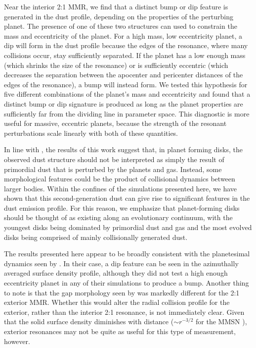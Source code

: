 \documentclass[twocolumn]{aastex63}
\begin{document}
Near the interior 2:1 MMR, we find that a distinct bump or dip feature is generated in the dust profile, depending on the properties of the perturbing 
planet. The presence of one of these two structures can used to constrain the mass and eccentricity of the planet. For a high mass, low eccentricity 
planet, a dip will form in the dust profile because the edges of the resonance, where many collisions occur, stay sufficiently separated. If the planet 
has a low enough mass (which shrinks the size of the resonance) or is sufficiently eccentric (which decreases the separation between the apocenter 
and pericenter distances of the edges of the resonance), a bump will instead form. We tested this hypothesis for five different combinations of the 
planet's mass and eccentricity and found that a distinct bump or dip signature is produced as long as the planet properties are sufficiently far from 
the dividing line in parameter space. This diagnostic is more useful for massive, eccentric planets, because the strength of the resonant 
perturbations scale linearly with both of these quantities.

In line with \citet{2017ApJ...850..103B}, the results of this work suggest that, in planet forming disks, the observed dust structure should not be 
interpreted as simply the result of primordial dust that is perturbed by the planets and gas. Instead, some morphological features could be the product 
of collisional dynamics between larger bodies. Within the confines of the simulations presented here, we have shown that this second-generation dust 
can give rise to significant features in the dust emission profile. For this reason, we emphasize that planet-forming disks should be thought of as 
existing along an evolutionary continuum, with the youngest disks being dominated by primordial dust and gas and the most evolved disks being 
comprised of mainly collisionally generated dust.

The results presented here appear to be broadly consistent with the planetesimal dynamics seen by \citet{2016ApJ...818..159T}. In their case, a dip 
feature can be seen in the azimuthally averaged surface density profile, although they did not test a high enough eccentricity planet in any of their 
simulations to produce a bump. Another thing to note is that the gap morphology seen by \citet{2016ApJ...818..159T} was markedly different for the 
2:1 exterior MMR. Whether this would alter the radial collision profile for the exterior, rather than the interior 2:1 resonance, is not immediately clear.  
Given that the solid surface density diminishes with distance ($\sim r^{-3/2}$ for the MMSN \citep{1981PThPS..70...35H}), exterior resonances may 
not be quite as useful for this type of measurement, however.
\end{document}
